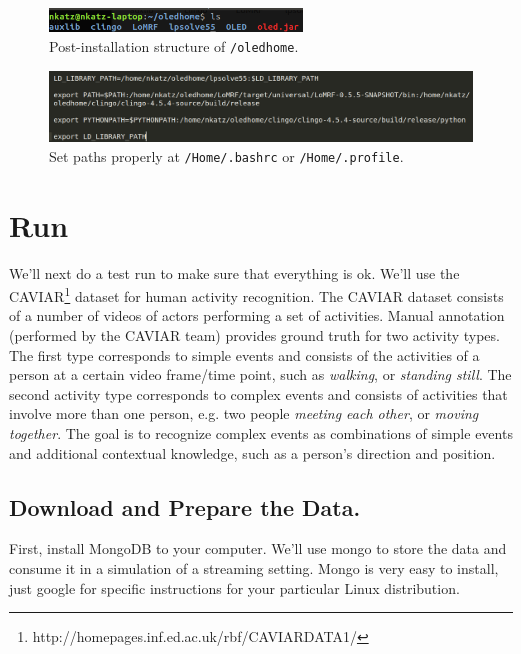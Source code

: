 \documentclass[12pt]{article}
\newcommand{\home}{\texttt{/oledhome}}
\begin{document}
 

\begin{figure}[t]
\centering
\includegraphics[width=0.6\textwidth]{./figures/install-1}
\caption{Post-installation structure of \home.}%
\label{fig:install}
\end{figure}


\begin{figure}[t]
\centering
\includegraphics[width=1\textwidth]{./figures/paths}
\caption{Set paths properly at \texttt{/Home/.bashrc} or \texttt{/Home/.profile}.}%
\label{fig:install}
\end{figure}

\section{Run}
We'll next do a test run to make sure that everything is ok. We'll use the CAVIAR\footnote{http://homepages.inf.ed.ac.uk/rbf/CAVIARDATA1/} dataset for human activity recognition. The CAVIAR dataset consists of a number of videos of actors performing a set of activities. Manual annotation (performed by the CAVIAR team) provides ground truth for two activity types. The first type corresponds to simple events and consists of the activities of a person at a certain video frame/time point, such as \emph{walking}, or \emph{standing still}. The second activity type corresponds to complex events and consists of activities that involve more than one person, e.g. two people \emph{meeting each other}, or \emph{moving together}. The goal is to recognize complex events as combinations of simple events and additional contextual knowledge, such as a person's direction and position. 

\subsection{Download and Prepare the Data.}

First, install MongoDB to your computer. We'll use mongo to store the data and consume it in a simulation of a streaming setting. Mongo is very easy to install, just google for specific instructions for your particular Linux distribution.  
\end{document}

